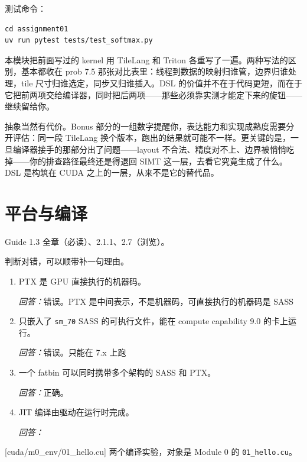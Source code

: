\documentclass[11pt,a4paper,fontset=none]{ctexart}
\begin{document}
测试命令：

\begin{lstlisting}
cd assignment01
uv run pytest tests/test_softmax.py
\end{lstlisting}

\begin{lookback}
本模块把前面写过的 kernel 用 TileLang 和 Triton 各重写了一遍。两种写法的区别，基本都收在 prob 7.5 那张对比表里：线程到数据的映射归谁管，边界归谁处理，tile 尺寸归谁选定，同步又归谁插入。DSL 的价值并不在于代码更短，而在于它把前两项交给编译器，同时把后两项——那些必须靠实测才能定下来的旋钮——继续留给你。

抽象当然有代价。Bonus 部分的一组数字提醒你，表达能力和实现成熟度需要分开评估：同一段 TileLang 换个版本，跑出的结果就可能不一样。更关键的是，一旦编译器接手的那部分出了问题——layout 不合法、精度对不上、边界被悄悄吃掉——你的排查路径最终还是得退回 SIMT 这一层，去看它究竟生成了什么。DSL 是构筑在 CUDA 之上的一层，从来不是它的替代品。
\end{lookback}

\section{平台与编译}

\begin{reading}
Guide 1.3 全章（必读）、2.1.1、2.7（浏览）。
\end{reading}

判断对错，可以顺带补一句理由。
\begin{enumerate}[label=(\alph*)]
  \item PTX 是 GPU 直接执行的机器码。
  \par\noindent\textit{回答：}错误。PTX 是中间表示，不是机器码，可直接执行的机器码是 SASS
  \item 只嵌入了 \texttt{sm\_70} SASS 的可执行文件，能在 compute capability 9.0 的卡上运行。
  \par\noindent\textit{回答：}错误。只能在 7.x 上跑
  \item 一个 fatbin 可以同时携带多个架构的 SASS 和 PTX。
  \par\noindent\textit{回答：}正确。
  \item JIT 编译由驱动在运行时完成。
  \par\noindent\textit{回答：}
\end{enumerate}

[cuda/m0\_env/01\_hello.cu]
两个编译实验，对象是 Module 0 的 \texttt{01\_hello.cu}。
\end{document}
